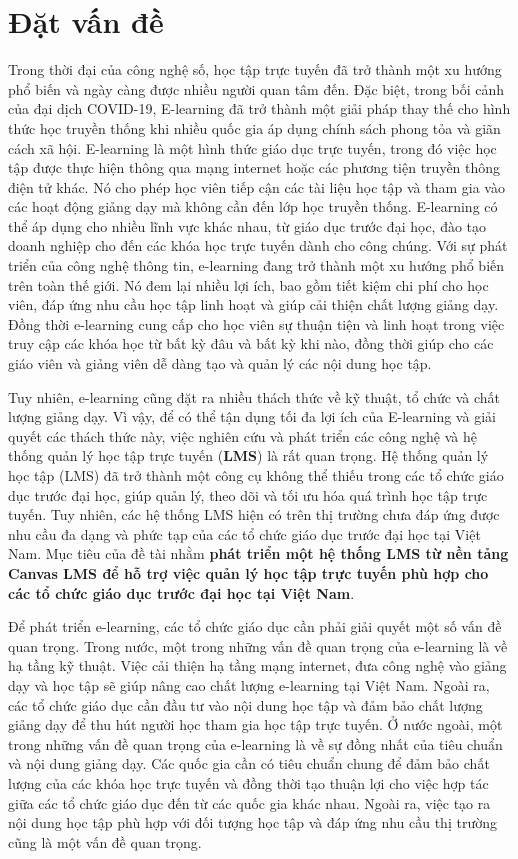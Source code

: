 \documentclass[../Thesis.tex]{subfiles}
\begin{document}
\section{Đặt vấn đề}
Trong thời đại của công nghệ số, học tập trực tuyến đã trở thành một xu hướng phổ biến và ngày càng được nhiều người quan tâm đến. Đặc biệt, trong bối cảnh của đại dịch COVID-19,
E-learning đã trở thành một giải pháp thay thế cho hình thức học truyền thống khi nhiều quốc gia áp dụng chính sách phong tỏa và giãn cách xã hội.
E-learning là một hình thức giáo dục trực tuyến, trong đó việc học tập được thực hiện thông qua mạng internet hoặc các phương tiện truyền thông điện tử khác. Nó cho phép học viên tiếp cận các tài liệu học tập và tham gia vào các hoạt động giảng dạy mà không cần đến lớp học truyền thống. E-learning có thể áp dụng cho nhiều lĩnh vực khác nhau, từ giáo dục trước đại học, đào tạo doanh nghiệp cho đến các khóa học trực tuyến dành cho công chúng.
Với sự phát triển của công nghệ thông tin, e-learning đang trở thành một xu hướng phổ biến trên toàn thế giới. Nó đem lại nhiều lợi ích, bao gồm tiết kiệm chi phí cho học viên, đáp ứng nhu cầu học tập linh hoạt và giúp cải thiện chất lượng giảng dạy.
Đồng thời e-learning cung cấp cho học viên sự thuận tiện và linh hoạt trong việc truy cập các khóa học từ bất kỳ đâu và bất kỳ khi nào, đồng thời giúp cho các giáo viên và giảng viên dễ dàng tạo và quản lý các nội dung học tập.

Tuy nhiên, e-learning cũng đặt ra nhiều thách thức về kỹ thuật, tổ chức và chất lượng giảng dạy. Vì vậy, để có thể tận dụng tối đa lợi ích của E-learning và giải quyết các thách thức này,
việc nghiên cứu và phát triển các công nghệ và hệ thống quản lý học tập trực tuyến (\textbf{LMS}) là rất quan trọng.
Hệ thống quản lý học tập (LMS) đã trở thành một công cụ không thể thiếu trong các tổ chức giáo dục trước đại học, giúp quản lý, theo dõi và tối ưu hóa quá trình học tập trực tuyến. Tuy nhiên, các hệ thống LMS hiện có trên thị trường chưa đáp ứng được nhu cầu đa dạng và phức tạp của các tổ chức giáo dục trước đại học tại Việt Nam.
Mục tiêu của đề tài nhằm \textbf{phát triển một hệ thống LMS từ nền tảng Canvas LMS để hỗ trợ việc quản lý học tập trực tuyến phù hợp cho các tổ chức giáo dục trước đại học tại Việt Nam}.

Để phát triển e-learning, các tổ chức giáo dục cần phải giải quyết một số vấn đề quan trọng.
Trong nước, một trong những vấn đề quan trọng của e-learning là về hạ tầng kỹ thuật. Việc cải thiện hạ tầng mạng internet, đưa công nghệ vào giảng dạy và học tập sẽ giúp nâng cao chất lượng e-learning tại Việt Nam. Ngoài ra, các tổ chức giáo dục cần đầu tư vào nội dung học tập và đảm bảo chất lượng giảng dạy để thu hút người học tham gia học tập trực tuyến.
Ở nước ngoài, một trong những vấn đề quan trọng của e-learning là về sự đồng nhất của tiêu chuẩn và nội dung giảng dạy. Các quốc gia cần có tiêu chuẩn chung để đảm bảo chất lượng của các khóa học trực tuyến và đồng thời tạo thuận lợi cho việc hợp tác giữa các tổ chức giáo dục đến từ các quốc gia khác nhau. Ngoài ra, việc tạo ra nội dung học tập phù hợp với đối tượng học tập và đáp ứng nhu cầu thị trường cũng là một vấn đề quan trọng.
\end{document}

